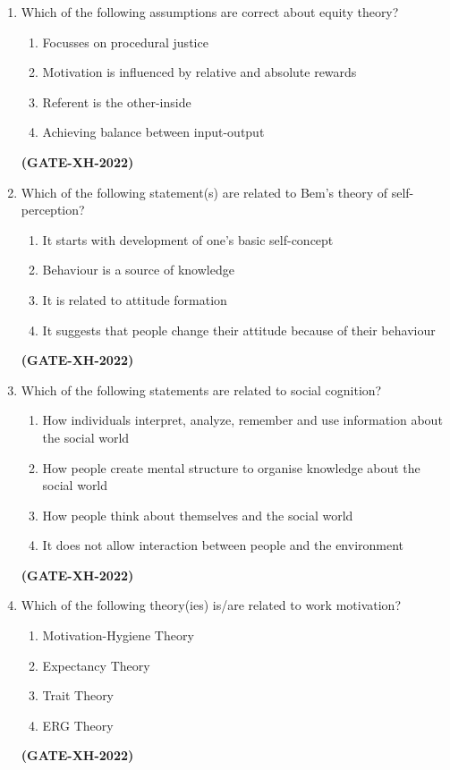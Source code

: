 \documentclass[journal]{IEEEtran}
\begin{document}
\begin{enumerate}
\item
Which of the following assumptions are correct about equity theory?  
\begin{enumerate}
\item Focusses on procedural justice 
\item Motivation is influenced by relative and absolute rewards 
\item Referent is the other-inside 
\item Achieving balance between input-output 
\end{enumerate}
\hfill\textbf{(GATE-XH-2022)}

\item
Which of the following statement(s) are related to Bem’s theory of self-perception? 
\begin{enumerate}
\item It starts with development of one’s basic self-concept 
\item Behaviour is a source of knowledge 
\item It is related to attitude formation 
\item It suggests that people change their attitude because of their behaviour
\end{enumerate}
\hfill\textbf{(GATE-XH-2022)}

\item
Which of the following statements are related to social cognition? 
\begin{enumerate}
\item How individuals interpret, analyze, remember and use information about the social world 
\item How people create mental structure to organise knowledge about the social world 
\item How people think about themselves and the social world  
\item It does not allow interaction between people and the environment 
\end{enumerate}
\hfill\textbf{(GATE-XH-2022)}

\item
Which of the following theory(ies) is/are related to work motivation? 
\begin{multicols}{2}
\begin{enumerate}
\item Motivation-Hygiene Theory 
\item Expectancy Theory 
\item Trait Theory 
\item ERG Theory 
\end{enumerate}
\end{multicols}
\hfill\textbf{(GATE-XH-2022)}


\end{enumerate}
\end{document}
